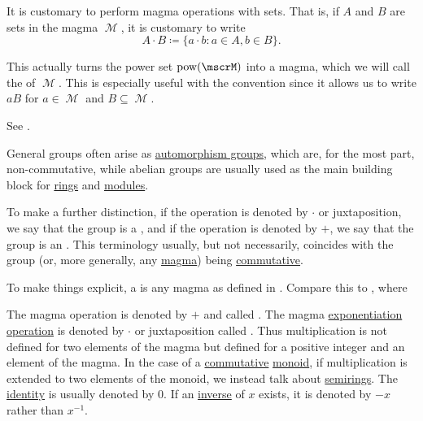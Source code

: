 \begin{definition}
\begin{thmenum}
     It is customary to perform magma operations with sets. That is, if \( A \) and \( B \) are sets in the magma \( \mscrM \), it is customary to write
    \begin{equation*}
      A \cdot B \coloneqq \{ a \cdot b \colon a \in A, b \in B \}.
    \end{equation*}

    This actually turns the power set \( \pow(\mscrM) \) into a magma, which we will call the  of \( \mscrM \). This is especially useful with the convention  since it allows us to write \( aB \) for \( a \in \mscrM \) and \( B \subseteq \mscrM \).

    See .
  \end{thmenum}
\end{definition}

\begin{remark}\label{rem:additive_magma}
  General groups often arise as \hyperref[def:automorphism_group]{automorphism groups}, which are, for the most part, non-commutative, while abelian groups are usually used as the main building block for \hyperref[def:semiring/ring]{rings} and \hyperref[def:left_module]{modules}.

  To make a further distinction, if the operation is denoted by \( \cdot \) or juxtaposition, we say that the group is a , and if the operation is denoted by \( + \), we say that the group is an . This terminology usually, but not necessarily, coincides with the group (or, more generally, any \hyperref[def:magma]{magma}) being \hyperref[def:magma/commutative]{commutative}.

  To make things explicit, a  is any magma as defined in . Compare this to , where
  \begin{thmenum}
     The magma operation is denoted by \( + \) and called .
     The magma \hyperref[def:magma/exponentiation]{exponentiation operation} is denoted by \( \cdot \) or juxtaposition called . Thus multiplication is not defined for two elements of the magma but defined for a positive integer and an element of the magma. In the case of a \hyperref[def:magma/commutative]{commutative} \hyperref[def:unital_magma/associative]{monoid}, if multiplication is extended to two elements of the monoid, we instead talk about \hyperref[def:semiring]{semirings}.
     The \hyperref[def:magma_identity]{identity} is usually denoted by \( 0 \).
     If an \hyperref[def:unital_magma_inverse_element]{inverse} of \( x \) exists, it is denoted by \( -x \) rather than \( x^{-1} \).
  \end{thmenum}
\end{remark}

